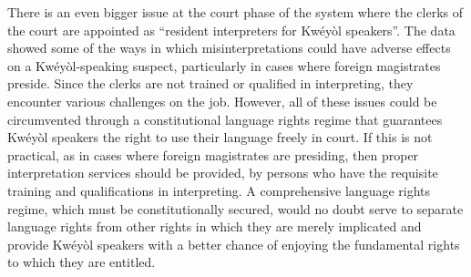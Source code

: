 \documentclass[output=paper,colorlinks,citecolor=brown]{langscibook}
\begin{document}
There is an even bigger issue at the court phase of the system where the clerks of the court are appointed as “resident interpreters for Kwéyòl speakers”. The data showed some of the ways in which misinterpretations could have adverse effects on a Kwéyòl-speaking suspect, particularly in cases where foreign magistrates preside. Since the clerks are not trained or qualified in interpreting, they encounter various challenges on the job. However, all of these issues could be circumvented through a constitutional language rights regime that guarantees Kwéyòl speakers the right to use their language freely in court. If this is not practical, as in cases where foreign magistrates are presiding, then proper interpretation services should be provided, by persons who have the requisite training and qualifications in interpreting. A comprehensive language rights regime, which must be constitutionally secured, would no doubt serve to separate language rights from other rights in which they are merely implicated and provide Kwéyòl speakers with a better chance of enjoying the fundamental rights to which they are entitled.


{\sloppy\printbibliography[heading=subbibliography,notkeyword=this]}
\end{document}
